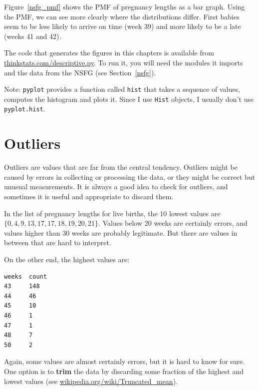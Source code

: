 \documentclass[12pt]{book}
\begin{document}

Figure~\ref{nsfg_pmf} shows the PMF of pregnancy lengths as a bar
graph.  Using the PMF, we can see more clearly where the distributions
differ.  First babies seem to be less likely to arrive on time (week
39) and more likely to be a late (weeks 41 and 42).

The code that generates the figures in this chapters is available from
\url{thinkstats.com/descriptive.py}.  To run it, you will need the
modules it imports and the data from the NSFG (see
Section~\ref{nsfg}).


Note: {\tt pyplot} provides a function called {\tt hist} that
takes a sequence of values, computes the histogram and plots it.
Since I use {\tt Hist} objects, I usually don't use {\tt pyplot.hist}.


\section{Outliers}

Outliers are values that are far from the central tendency.  Outliers
might be caused by errors in collecting or processing the data, or
they might be correct but unusual measurements.  It is always a good
idea to check for outliers, and sometimes it is useful and appropriate
to discard them.


In the list of pregnancy lengths for live births, the 10 lowest values
are $\{ 0, 4, 9, 13, 17, 17, 18, 19, 20, 21 \}$.  Values below 20
weeks are certainly errors, and values higher than 30 weeks are
probably legitimate.  But there are values in between that are
hard to interpret.


On the other end, the highest values are:

\begin{verbatim}
weeks  count
43     148
44     46
45     10
46     1
47     1
48     7
50     2
\end{verbatim}

Again, some values are almost certainly errors,
but it is hard to know for sure.  One option is to {\bf trim} the data
by discarding some fraction of the highest and lowest values (see
\url{wikipedia.org/wiki/Truncated_mean}).
\end{document}
